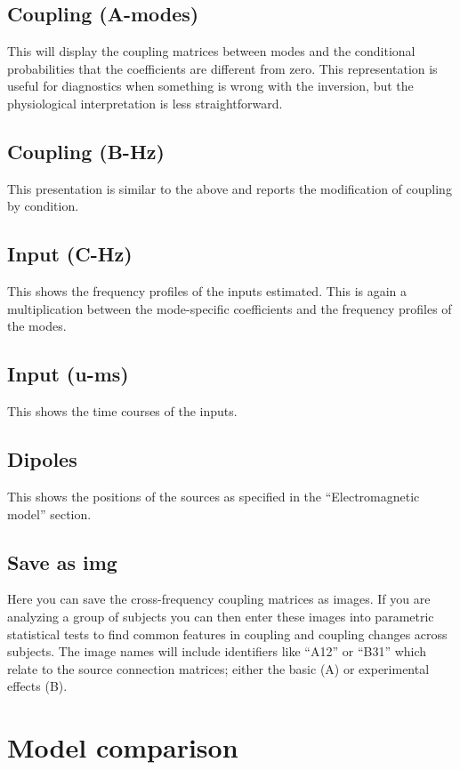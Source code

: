 \subsection{Coupling (A-modes)}
This will display the coupling matrices between modes and the conditional probabilities that the coefficients are different from zero. This representation is useful for diagnostics when something is wrong with the inversion, but the physiological interpretation is less straightforward.

\subsection{Coupling (B-Hz)}
This presentation is similar to the above and reports the modification of coupling by condition. 

\subsection{Input (C-Hz)}
This shows the frequency profiles of the inputs estimated. This is again a multiplication between the mode-specific coefficients and the frequency profiles of the modes. 

\subsection{Input (u-ms)}
This shows the time courses of the inputs.

\subsection{Dipoles}
This shows the positions of the sources as specified in the ``Electromagnetic model'' section.

\subsection{Save as img}
Here you can save the cross-frequency coupling matrices as images. If you are analyzing a group of subjects you can then enter these images into parametric statistical tests to find common features in coupling and coupling changes across subjects. The image names will include identifiers like ``A12'' or ``B31'' which relate to the source connection matrices; either the basic (A) or experimental effects (B).

\section{Model comparison}


